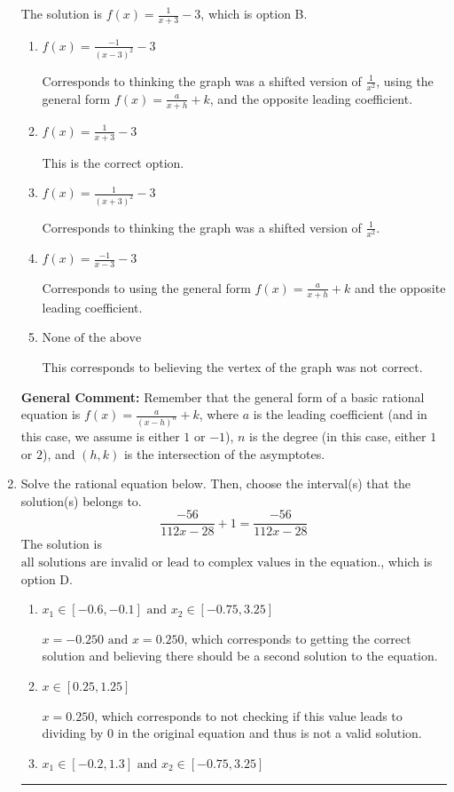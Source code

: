 \documentclass{extbook}[14pt]
\newcommand{\litem}[1]{\item #1

\rule{\textwidth}{0.4pt}}
\begin{document}
\begin{enumerate}
{The solution is \( f(x) = \frac{1}{x + 3} - 3 \), which is option B.\begin{enumerate}[label=\Alph*.]
\item \( f(x) = \frac{-1}{(x - 3)^2} - 3 \)

Corresponds to thinking the graph was a shifted version of $\frac{1}{x^2}$, using the general form $f(x) = \frac{a}{x+h}+k$, and the opposite leading coefficient.
\item \( f(x) = \frac{1}{x + 3} - 3 \)

This is the correct option.
\item \( f(x) = \frac{1}{(x + 3)^2} - 3 \)

Corresponds to thinking the graph was a shifted version of $\frac{1}{x^2}$.
\item \( f(x) = \frac{-1}{x - 3} - 3 \)

Corresponds to using the general form $f(x) = \frac{a}{x+h}+k$ and the opposite leading coefficient.
\item \( \text{None of the above} \)

This corresponds to believing the vertex of the graph was not correct.
\end{enumerate}

\textbf{General Comment:} Remember that the general form of a basic rational equation is $ f(x) = \frac{a}{(x-h)^n} + k$, where $a$ is the leading coefficient (and in this case, we assume is either $1$ or $-1$), $n$ is the degree (in this case, either $1$ or $2$), and $(h, k)$ is the intersection of the asymptotes.
}
\litem{
Solve the rational equation below. Then, choose the interval(s) that the solution(s) belongs to.
\[ \frac{-56}{112x -28} + 1 = \frac{-56}{112x -28} \]The solution is \( \text{all solutions are invalid or lead to complex values in the equation.} \), which is option D.\begin{enumerate}[label=\Alph*.]
\item \( x_1 \in [-0.6, -0.1] \text{ and } x_2 \in [-0.75,3.25] \)

$x = -0.250 \text{ and } x = 0.250$, which corresponds to getting the correct solution and believing there should be a second solution to the equation.
\item \( x \in [0.25,1.25] \)

$x = 0.250$, which corresponds to not checking if this value leads to dividing by 0 in the original equation and thus is not a valid solution.
\item \( x_1 \in [-0.2, 1.3] \text{ and } x_2 \in [-0.75,3.25] \)


\end{enumerate}}
\end{enumerate}
\end{document}
